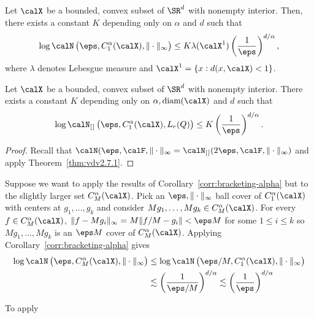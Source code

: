 \begin{theorem}
	\label{thm:vdv2.7.1}
	Let \(\calX\) be a bounded, convex subset of \(\SR^d\) with nonempty interior. Then, there exists a constant \(K\) depending only on \(\alpha\) and \(d\) such that 
	\[
		\log \calN\left(\eps,C_1^\alpha(\calX),\|\cdot\|_\infty\right) \leq K\lambda(\calX^1)\left(\frac{1}{\eps}\right)^{d/\alpha}
	,\] 
	where \(\lambda\) denotes Lebesgue measure and \(\calX^1 = \{x:d(x,\calX)<1\}\).
\end{theorem}
\begin{corollary}
    \label{corr:bracketing-alpha}
	Let \(\calX\) be a bounded, convex subset of \(\SR^d\) with nonempty interior. There exists a constant \(K\) depending only on \(\alpha,\text{diam}(\calX)\) and \(d\) such that 
	\[
		\log \calN_{[\hspace{0.1em}]}\left(\eps,C_1^\alpha(\calX),L_r(Q)\right) \leq K\left(\frac{1}{\eps}\right)^{d/\alpha}
	.\] 
\end{corollary}
\begin{proof}
	Recall that \(\calN(\eps,\calF,\|\cdot\|_\infty = \calN_{[\hspace{0.1em}]}(2\eps,\calF,\|\cdot\|_\infty)\) and apply Theorem~\ref{thm:vdv2.7.1}.
\end{proof}
\begin{remark*}
	Suppose we want to apply the results of Corollary~\ref{corr:bracketing-alpha} but to the slightly larger set \(C_M^\alpha(\calX)\). Pick an \(\eps,\|\cdot\|_\infty\) ball cover of \(C_1^\alpha(\calX)\) with centers at \(g_1,\dots,g_k\) and consider \(Mg_1,\dots,Mg_k \in C_M^\alpha(\calX)\). For every \(f\in C_M^\alpha(\calX)\), \(\|f-Mg_i\|_\infty = M\|f/M-g_i\| <\eps M\) for some \(1\leq i\leq k\) so \(Mg_1,\dots,Mg_k\) is an \(\eps M\) cover of \(C_M^\alpha(\calX)\). Applying Corollary~\ref{corr:bracketing-alpha} gives
	\begin{align*}
		\log\calN\left(\eps,C_M^\alpha(\calX),\|\cdot\|_\infty\right) 
		&\leq \log\calN\left(\eps/M,C_1^\alpha(\calX),\|\cdot\|_\infty\right) \\
		&\lesssim \left(\frac{1}{\eps/M}\right)^{d/\alpha} \lesssim \left(\frac{1}{\eps}\right)^{d/\alpha}
	\end{align*}
\end{remark*}
\begin{example*}
	To apply 
\end{example*}



